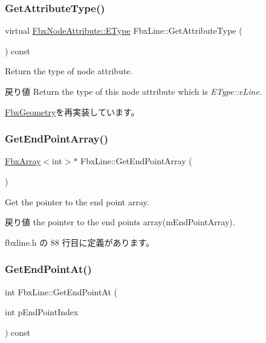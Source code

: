 \subsubsection{\texorpdfstring{Get\+Attribute\+Type()}{GetAttributeType()}}
{\footnotesize\ttfamily virtual \hyperlink{class_fbx_node_attribute_a08e1669d3d1a696910756ab17de56d6a}{Fbx\+Node\+Attribute\+::\+E\+Type} Fbx\+Line\+::\+Get\+Attribute\+Type (\begin{DoxyParamCaption}{ }\end{DoxyParamCaption}) const\hspace{0.3cm}{\ttfamily [virtual]}}

Return the type of node attribute. \begin{DoxyReturn}{戻り値}
Return the type of this node attribute which is {\itshape E\+Type\+::e\+Line}. 
\end{DoxyReturn}


\hyperlink{class_fbx_geometry_a41ae23e5d0cf08693bca49737f333de9}{Fbx\+Geometry}を再実装しています。

\mbox{\label{class_fbx_line_aeeb413ccc5affa0f04d1b5275d355c9b}} 
\subsubsection{\texorpdfstring{Get\+End\+Point\+Array()}{GetEndPointArray()}}
{\footnotesize\ttfamily \hyperlink{class_fbx_array}{Fbx\+Array}$<$int$>$$\ast$ Fbx\+Line\+::\+Get\+End\+Point\+Array (\begin{DoxyParamCaption}{ }\end{DoxyParamCaption})\hspace{0.3cm}{\ttfamily [inline]}}

Get the pointer to the end point array. \begin{DoxyReturn}{戻り値}
the pointer to the end points array(m\+End\+Point\+Array). 
\end{DoxyReturn}


 fbxline.\+h の 88 行目に定義があります。

\mbox{\label{class_fbx_line_a5a0bcc66d6ba13f98fd9e546bf5f704a}} 
\subsubsection{\texorpdfstring{Get\+End\+Point\+At()}{GetEndPointAt()}}
{\footnotesize\ttfamily int Fbx\+Line\+::\+Get\+End\+Point\+At (\begin{DoxyParamCaption}\item[{int}]{p\+End\+Point\+Index }\end{DoxyParamCaption}) const}

